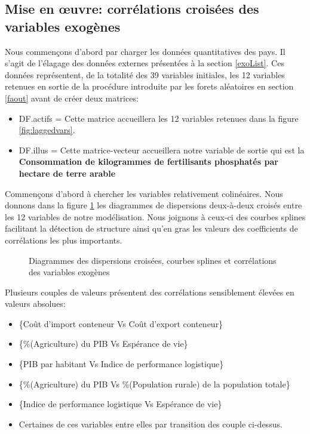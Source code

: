 	\subsection{Mise en œuvre: corrélations croisées des variables exogènes}
	Nous commençons d'abord par charger les données quantitatives des pays. Il s'agit de l'élagage des données externes présentées à la section \ref{exoList}. Ces données représentent, de la totalité des 39 variables initiales, les 12 variables retenues en sortie de la procédure introduite par les forets aléatoires en section \ref{faout} avant de créer deux matrices:\begin{itemize}
	\item DF.actifs = Cette matrice accueillera les 12 variables retenues dans la figure \ref{fig:laggedvars}.
	\item DF.illus = Cette matrice-vecteur accueillera notre variable de sortie qui est la \textbf{Consommation de kilogrammes de fertilisants phosphatés par hectare de terre arable} 
	\end{itemize}
	Commençons d'abord à chercher les variables relativement colinéaires. Nous donnons dans la figure \ref{fig:scatter} les diagrammes de dispersions deux-à-deux croisés entre les 12 variables de notre modélisation. Nous joignons à ceux-ci des courbes splines facilitant la détection de structure ainsi qu'en gras les valeurs des coefficients de corrélations les plus importants.
			\begin{figure}[h]
				    		\centering
				    		\caption{Diagrammes des dispersions croisées, courbes splines et corrélations des variables exogènes}
				    		\label{fig:scatter}
			\end{figure}
	Plusieurs couples de valeurs présentent des corrélations sensiblement élevées en valeurs absolues:
	\begin{itemize}
	\item \{Coût d'import conteneur Vs Coût d'export conteneur\}
	\item \{\%(Agriculture) du PIB Vs Espérance de vie\}
	\item \{PIB par habitant Vs Indice de performance logistique\}
	\item \{\%(Agriculture) du PIB Vs \%(Population rurale) de la population totale\}
	\item \{Indice de performance logistique Vs Espérance de vie\}
	\item Certaines de ces variables entre elles par transition des couple ci-dessus.
	\end{itemize}
